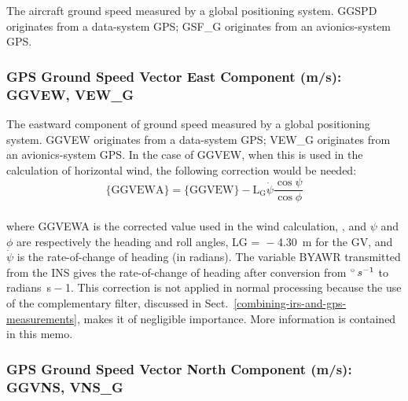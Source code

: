 \documentclass[
  english,
]{book}
\begin{document}
The aircraft ground speed measured by a global positioning system. GGSPD originates from a data-system GPS; GSF\_G originates from an avionics-system GPS.

\hypertarget{ggvew}{%
\subsubsection*{GPS Ground Speed Vector East Component (m/s): GGVEW, VEW\_G}\label{ggvew}}

The eastward component of ground speed measured by a global positioning system. GGVEW originates from a data-system GPS; VEW\_G originates from an avionics-system GPS. In the case of GGVEW, when this is used in the calculation of horizontal wind, the following correction would be needed:
\begin{equation}
\mathrm{\{GGVEWA\}}=\mathrm{\{GGVEW\}-L_G}\dot{\psi}\frac{\cos\psi}{\cos\phi}
\label{eq:GGVEWA}
\end{equation}\\
where GGVEWA is the corrected value used in the wind calculation, , and \(\psi\) and \(\phi\) are respectively the heading and roll angles, {LG =  − 4.30}~m for the GV, and \(\dot{\psi}\) is the rate-of-change of heading (in radians). The variable BYAWR transmitted from the INS gives the rate-of-change of heading after conversion from {\(^{\circ}\thinspace s^{-1}\)} to radians~{s − 1}. This correction is not applied in normal processing because the use of the complementary filter, discussed in Sect.~\ref{combining-irs-and-gps-measurements}, makes it of negligible importance. More information is contained in this memo.

\hypertarget{ggvns}{%
\subsubsection*{GPS Ground Speed Vector North Component (m/s): GGVNS, VNS\_G}\label{ggvns}}
\end{document}
